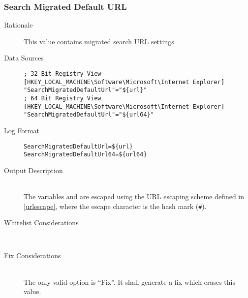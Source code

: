 \subsubsection{Search Migrated Default URL}
\begin{description}
\item[Rationale] This value contains migrated search URL settings.

\item[Data Sources] \hfill
\vspace{-\baselineskip}
\begin{verbatim}
; 32 Bit Registry View
[HKEY_LOCAL_MACHINE\Software\Microsoft\Internet Explorer]
"SearchMigratedDefaultUrl"="${url}"
; 64 Bit Registry View
[HKEY_LOCAL_MACHINE\Software\Microsoft\Internet Explorer]
"SearchMigratedDefaultUrl"="${url64}"
\end{verbatim}
\item[Log Format] \hfill
\vspace{-\baselineskip}
\begin{verbatim} 
SearchMigratedDefaultUrl=${url}
SearchMigratedDefaultUrl64=${url64}
\end{verbatim}
\item[Output Description] \hfill \\
The variables  and  are escaped using the URL escaping
scheme defined in \ref{urlescape}, where the escape character is the hash mark
(\verb|#|).
\item[Whitelist Considerations] \hfill \\

\item[Fix Considerations] \hfill \\
The only valid option is ``Fix''. It shall generate a fix which erases this
value.
\end{description}

